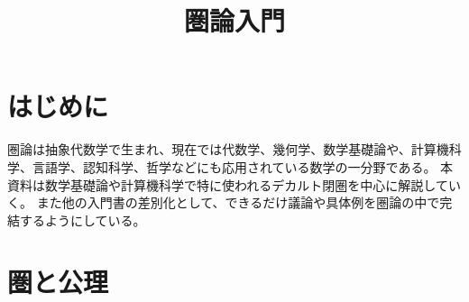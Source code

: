 \documentclass[dvipdfmx]{jsarticle}
\numberwithin{proof}{subsection}
\numberwithin{prop}{subsection}
\numberwithin{define}{subsection}
\begin{document}
	\title{圏論入門}
	\maketitle
	\tableofcontents
	\section{はじめに}
	圏論は抽象代数学で生まれ、現在では代数学、幾何学、数学基礎論や、計算機科学、言語学、認知科学、哲学などにも応用されている数学の一分野である。
	本資料は数学基礎論や計算機科学で特に使われるデカルト閉圏を中心に解説していく。
	また他の入門書の差別化として、できるだけ議論や具体例を圏論の中で完結するようにしている。
	\section{圏と公理}
\end{document}
